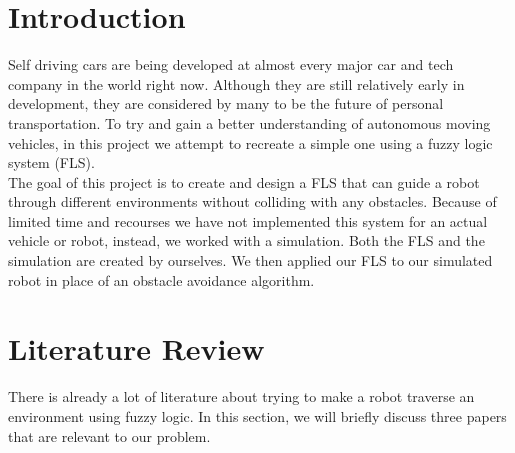 \documentclass[conference]{IEEEtran}
\begin{document}
\section{Introduction}
Self driving cars are being developed at almost every major car and tech company in the world right now. Although they are still relatively early in development, they are considered by many to be the future of personal transportation. To try and gain a better understanding of autonomous moving vehicles, in this project we attempt to recreate a simple one using a fuzzy logic system (FLS).\\
The goal of this project is to create and design a FLS that can guide a robot through different environments without colliding with any obstacles. Because of limited time and recourses we have not implemented this system for an actual vehicle or robot, instead, we worked with a simulation. Both the FLS and the simulation are created by ourselves. We then applied our FLS to our simulated robot in place of an obstacle avoidance algorithm.


\section{Literature Review}
There is already a lot of literature about trying to make a robot traverse an environment using fuzzy logic. In this section, we will briefly discuss three papers that are relevant to our problem.
\end{document}
